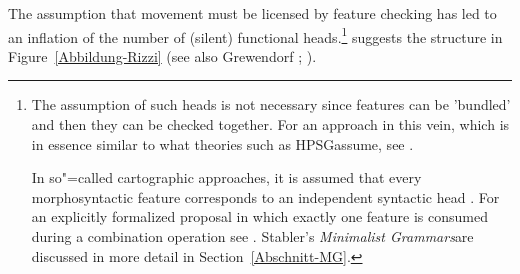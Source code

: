 The assumption that movement must be licensed by feature checking has led to an inflation of the number of (silent) functional 
heads.\footnote{%
	The assumption of such heads is not necessary since features can be 'bundled' and then they
        can be checked together. For an approach in this vein,
	which is in essence similar to what theories such as HPSG\indexhpsg assume, see .

In so"=called cartographic approaches, it is assumed that every morphosyntactic feature corresponds to an independent syntactic
head \citep[, 61]{CR2010a}. For an explicitly formalized proposal in which exactly one
feature is consumed during a combination operation see . Stabler's \emph{Minimalist
    Grammars}\indexmg are discussed in more detail in Section~\ref{Abschnitt-MG}.
} 
\citet[]{Rizzi97a-u} suggests the structure in Figure~\vref{Abbildung-Rizzi} (see also Grewendorf \citeyear[, 240]{Grewendorf2002a}; \citeyear{Grewendorf2009a}).\pagebreak

